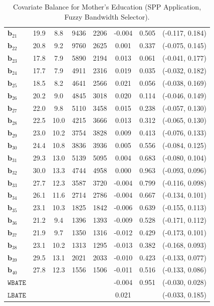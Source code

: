 \documentclass[10pt]{article}
\newcommand{\bb}{\mathbf{b}}
\begin{document}
\begin{table}[p]
\begin{tabular}{lccccccc}
   $\bb_{21}$ & 19.9 & 8.8 & 9436 & 2206 & -0.004 & 0.505 & (-0.117, 0.184)\\
   $\bb_{22}$ & 20.8 & 9.2 & 9760 & 2625 & 0.001 & 0.337 & (-0.075, 0.145)\\
   $\bb_{23}$ & 17.8 & 7.9 & 5890 & 2194 & 0.013 & 0.061 & (-0.041, 0.177)\\
   $\bb_{24}$ & 17.7 & 7.9 & 4911 & 2316 & 0.019 & 0.035 & (-0.032, 0.182)\\
   $\bb_{25}$ & 18.5 & 8.2 & 4641 & 2566 & 0.021 & 0.056 & (-0.038, 0.169)\\
   $\bb_{26}$ & 20.2 & 9.0 & 4845 & 3018 & 0.020 & 0.114 & (-0.046, 0.149)\\
   $\bb_{27}$ & 22.0 & 9.8 & 5110 & 3458 & 0.015 & 0.238 & (-0.057, 0.130)\\
   $\bb_{28}$ & 22.5 & 10.0 & 4215 & 3666 & 0.013 & 0.312 & (-0.065, 0.130)\\
   $\bb_{29}$ & 23.0 & 10.2 & 3754 & 3828 & 0.009 & 0.413 & (-0.076, 0.133)\\
   $\bb_{30}$ & 24.4 & 10.8 & 3836 & 3936 & 0.005 & 0.556 & (-0.084, 0.125)\\
   $\bb_{31}$ & 29.3 & 13.0 & 5139 & 5095 & 0.004 & 0.683 & (-0.080, 0.104)\\
   $\bb_{32}$ & 30.0 & 13.3 & 4744 & 4958 & 0.000 & 0.963 & (-0.093, 0.096)\\
   $\bb_{33}$ & 27.7 & 12.3 & 3587 & 3720 & -0.004 & 0.799 & (-0.116, 0.098)\\
   $\bb_{34}$ & 26.1 & 11.6 & 2714 & 2786 & -0.004 & 0.667 & (-0.134, 0.101)\\
   $\bb_{35}$ & 23.1 & 10.3 & 1825 & 1842 & -0.006 & 0.639 & (-0.155, 0.113)\\
   $\bb_{36}$ & 21.2 & 9.4 & 1396 & 1393 & -0.009 & 0.528 & (-0.171, 0.112)\\
   $\bb_{37}$ & 21.9 & 9.7 & 1350 & 1316 & -0.012 & 0.429 & (-0.173, 0.101)\\
   $\bb_{38}$ & 23.1 & 10.2 & 1313 & 1295 & -0.013 & 0.382 & (-0.168, 0.093)\\
   $\bb_{39}$ & 29.5 & 13.1 & 2021 & 2033 & -0.010 & 0.423 & (-0.133, 0.077)\\
   $\bb_{40}$ & 27.8 & 12.3 & 1556 & 1506 & -0.011 & 0.516 & (-0.133, 0.086)\\
  \midrule
   $\mathtt{WBATE}$ &  &  &  &  & -0.004 & 0.951 & (-0.030, 0.028)\\
  \midrule
   $\mathtt{LBATE}$ &  &  &  &  & 0.021 &  & (-0.033, 0.185)\\
  \bottomrule\bottomrule
\end{tabular}

    \caption{Covariate Balance for Mother's Education (SPP Application, Fuzzy Bandwidth Selector).}
    \label{tab:sa-empapp_covbal_itt_bwmain}
\end{table}
\end{document}
